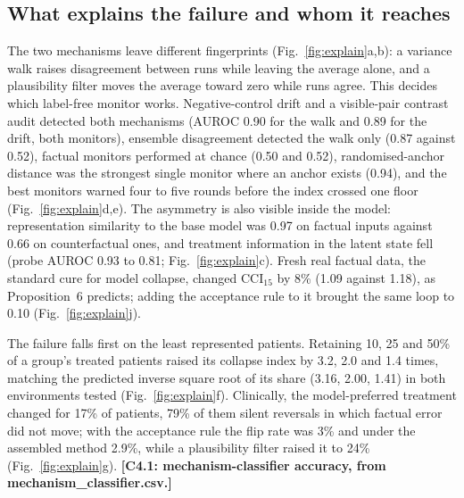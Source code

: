 \documentclass[11pt,a4paper]{article}
\newcommand{\tbd}[1]{{\color{red}\textbf{[#1]}}}
\newcommand{\CCI}{\mathrm{CCI}}
\begin{document}
\subsection{What explains the failure and whom it reaches}
The two mechanisms leave different fingerprints (Fig.~\ref{fig:explain}a,b): a variance walk raises disagreement between runs while leaving the average alone, and a plausibility filter moves the average toward zero while runs agree. This decides which label-free monitor works. Negative-control drift and a visible-pair contrast audit detected both mechanisms (AUROC 0.90 for the walk and 0.89 for the drift, both monitors), ensemble disagreement detected the walk only (0.87 against 0.52), factual monitors performed at chance (0.50 and 0.52), randomised-anchor distance was the strongest single monitor where an anchor exists (0.94), and the best monitors warned four to five rounds before the index crossed one floor (Fig.~\ref{fig:explain}d,e). The asymmetry is also visible inside the model: representation similarity to the base model was 0.97 on factual inputs against 0.66 on counterfactual ones, and treatment information in the latent state fell (probe AUROC 0.93 to 0.81; Fig.~\ref{fig:explain}c). Fresh real factual data, the standard cure for model collapse, changed $\CCI_{15}$ by 8\% (1.09 against 1.18), as Proposition~6 predicts; adding the acceptance rule to it brought the same loop to 0.10 (Fig.~\ref{fig:explain}j).

The failure falls first on the least represented patients. Retaining 10, 25 and 50\% of a group's treated patients raised its collapse index by 3.2, 2.0 and 1.4 times, matching the predicted inverse square root of its share (3.16, 2.00, 1.41) in both environments tested (Fig.~\ref{fig:explain}f). Clinically, the model-preferred treatment changed for 17\% of patients, 79\% of them silent reversals in which factual error did not move; with the acceptance rule the flip rate was 3\% and under the assembled method 2.9\%, while a plausibility filter raised it to 24\% (Fig.~\ref{fig:explain}g). \tbd{C4.1: mechanism-classifier accuracy, from mechanism\_classifier.csv.}
\end{document}
